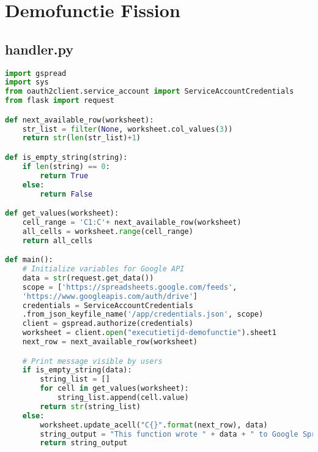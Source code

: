 \newpage
\section{Demofunctie Fission}
\subsection{handler.py}
\label{sec:demofunctie-fission}
\begin{lstlisting}[language=python]
import gspread
import sys
from oauth2client.service_account import ServiceAccountCredentials
from flask import request

def next_available_row(worksheet):
    str_list = filter(None, worksheet.col_values(3))
    return str(len(str_list)+1)

def is_empty_string(string):
    if len(string) == 0:
        return True
    else:
        return False

def get_values(worksheet):
    cell_range = 'C1:C'+ next_available_row(worksheet)
    all_cells = worksheet.range(cell_range)
    return all_cells

def main():   
    # Initialize variables for Google API
    data = str(request.get_data())
    scope = ['https://spreadsheets.google.com/feeds',
    'https://www.googleapis.com/auth/drive']
    credentials = ServiceAccountCredentials
    .from_json_keyfile_name('/app/credentials.json', scope)
    client = gspread.authorize(credentials)
    worksheet = client.open("executietijd-demofunctie").sheet1
    next_row = next_available_row(worksheet)

    # Print message visible by users
    if is_empty_string(data):
        string_list = []
        for cell in get_values(worksheet):
            string_list.append(cell.value)
        return str(string_list)
    else:
        worksheet.update_acell("C{}".format(next_row), data)
        string_output = "This function wrote " + data + " to Google Spreadsheets!"
        return string_output
\end{lstlisting}